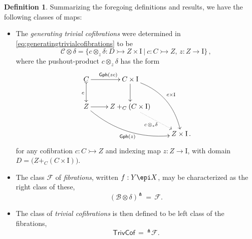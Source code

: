 \documentclass[11pt]{article}
\newcommand{\mono}{\ensuremath{\rightarrowtail}}
\newcommand{\I}{\ensuremath{\mathrm{I}}}
\theoremstyle{remark}
\theoremstyle{definition}
\newtheorem{definition}[theorem]{Definition}
\begin{document}
\begin{definition}\label{def:FibWFSclasses}
Summarizing the foregoing definitions and results, we have the following classes of maps:

%
%

\begin{itemize}
\item  The \emph{generating trivial cofibrations} were determined in \eqref{eq:generatingtrivialcofibrations} to be
\begin{equation}\label{eq:genunbiasedtrivcof}
\mathcal{C}\otimes\delta = \{c \otimes_z \delta : D \mono Z\times\I\ |\  c : C\mono Z,\, z : Z \to \I\}\,,
\end{equation}
where the pushout-product $c\otimes_z \delta$ has the form
\begin{equation}\label{diagram:unbiasedbasicpushoutproduct2}
\xymatrix{
C \ar@{>->}[d]_{c} \ar[r]^{\mathsf{Gph}(zc)} & C\times \I \ar[d] \ar@/^4ex/ [rdd]^{c\times\I}\\
Z \ar@/_4ex/ [rrd]_{\mathsf{Gph}(z)} \ar[r] &  Z +_C (C\times\I) \ar@{.>}[rd]_{c\, \otimes_z \delta} \\
&& Z\times\I\,.
}
\end{equation}
for any cofibration $c : C\mono Z$ and indexing map $z : Z \to \I$, with domain $D = \big(Z +_C (C\times\I)\big)$.

\item The class $\mathcal{F}$ of \emph{fibrations}, written $f : Y\epi X$, may be characterized as the right class of these,
\[
(\mathcal{B}\otimes\delta)^\pitchfork\, =\,\mathcal{F}.
\]

\item The class of \emph{trivial cofibrations} is then defined to be left class of the fibrations,
\[
\mathsf{TrivCof}\, =\, ^{\pitchfork}\mathcal{F}.
\]
\end{itemize}
\end{definition}
\end{document}
